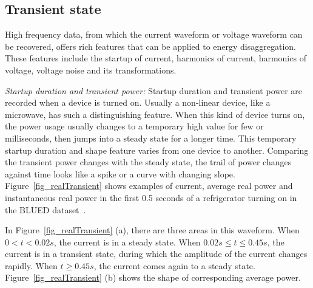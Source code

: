 \subsection{Transient state}
High frequency data, 
from which the current waveform or voltage waveform can be recovered, 
offers rich features that can be applied to energy disaggregation. 
These features include the startup of current, 
harmonics of current, 
harmonics of voltage, 
voltage noise and its transformations. 

\textit{Startup duration and transient power:}
Startup duration and transient power are recorded when a device is turned on. 
Usually a non-linear device, like a microwave, has such a distinguishing feature.
When this kind of device turns on,
the power usage usually changes to a temporary high value for few 
or milliseconds, %
then jumps into a steady state for a longer time.
This temporary startup duration and shape feature varies from one device to another. 
Comparing the transient power changes with the steady state, 
the trail of power changes against time looks like a spike or a curve with changing slope. 
Figure~\ref{fig_realTransient} shows examples of current, average real power and instantaneous
real power in the first 0.5 seconds of a refrigerator turning on in the 
BLUED dataset~\cite{anderson2012blued}. 
\iffalse
 \manishc{you said 0.5 sec in the previous
  sec; make it consistent, and this sentence seems like a repetition} \huijuanc{updated, and remove the repeated sentence}. 
\fi  
In Figure~\ref{fig_realTransient} (a), there are three areas in this waveform.
When $0<t<0.02s$, the current is in
a steady state.
When $0.02s \leq t \leq 0.45s$,
the current is in a transient state,
during which the amplitude of the current changes
rapidly. 
When $ t \geq 0.45s$, the current comes again to a
steady state.
Figure~\ref{fig_realTransient} (b) shows the shape of corresponding average power. 
\iffalse
{} 

